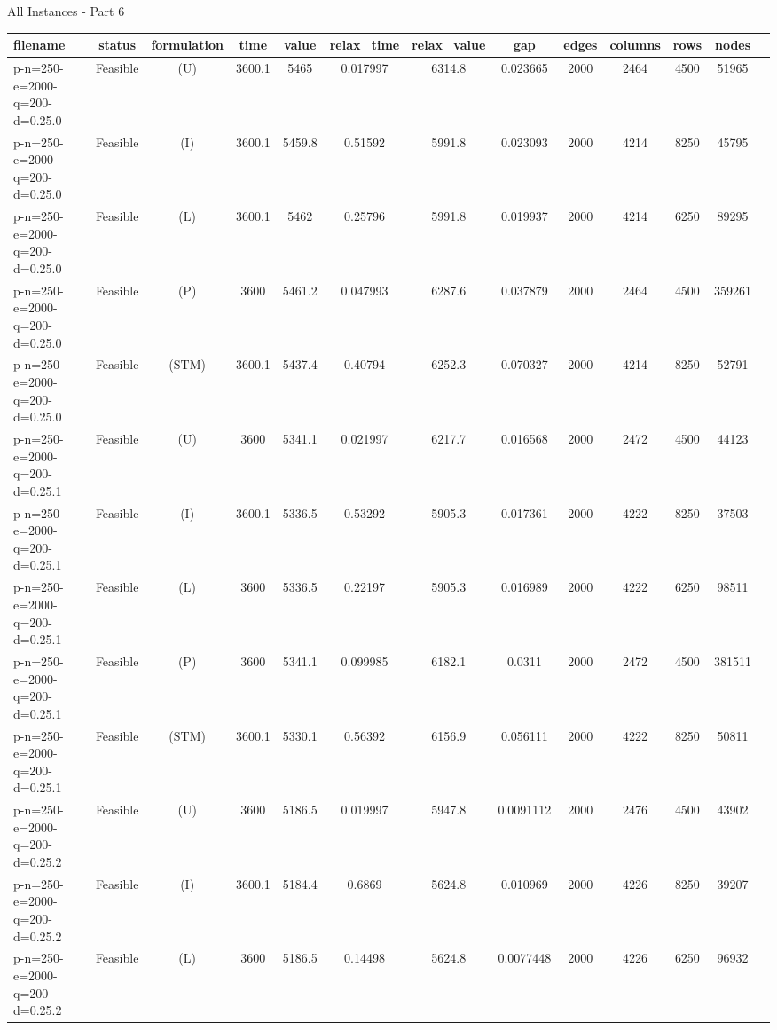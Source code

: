 \documentclass[landscape, a4paper]{article}
\newcommand{\STM}{\ensuremath{\mathrm{STM}}}
\newcommand{\Improved}{\ensuremath{\mathrm{I}}}
\newcommand{\Loose}{\ensuremath{\mathrm{L}}}
\newcommand{\Profit}{\ensuremath{\mathrm{P}}}
\newcommand{\Utility}{\ensuremath{\mathrm{U}}}
\begin{document}
\begin{center}
\newpage
All Instances - Part 6

\begin{tabular}{lcccccccccccc}
filename & status & formulation & time & value & relax\_time & relax\_value & gap & edges & columns & rows & nodes & \\
\hline
p-n=250-e=2000-q=200-d=0.25.0 & Feasible & (\Utility) & 3600.1 & 5465 & 0.017997 & 6314.8 & 0.023665 & 2000 & 2464 & 4500 & 51965 & \\
p-n=250-e=2000-q=200-d=0.25.0 & Feasible & (\Improved) & 3600.1 & 5459.8 & 0.51592 & 5991.8 & 0.023093 & 2000 & 4214 & 8250 & 45795 & \\
p-n=250-e=2000-q=200-d=0.25.0 & Feasible & (\Loose) & 3600.1 & 5462 & 0.25796 & 5991.8 & 0.019937 & 2000 & 4214 & 6250 & 89295 & \\
p-n=250-e=2000-q=200-d=0.25.0 & Feasible & (\Profit) & 3600 & 5461.2 & 0.047993 & 6287.6 & 0.037879 & 2000 & 2464 & 4500 & 359261 & \\
p-n=250-e=2000-q=200-d=0.25.0 & Feasible & (\STM) & 3600.1 & 5437.4 & 0.40794 & 6252.3 & 0.070327 & 2000 & 4214 & 8250 & 52791 & \\
p-n=250-e=2000-q=200-d=0.25.1 & Feasible & (\Utility) & 3600 & 5341.1 & 0.021997 & 6217.7 & 0.016568 & 2000 & 2472 & 4500 & 44123 & \\
p-n=250-e=2000-q=200-d=0.25.1 & Feasible & (\Improved) & 3600.1 & 5336.5 & 0.53292 & 5905.3 & 0.017361 & 2000 & 4222 & 8250 & 37503 & \\
p-n=250-e=2000-q=200-d=0.25.1 & Feasible & (\Loose) & 3600 & 5336.5 & 0.22197 & 5905.3 & 0.016989 & 2000 & 4222 & 6250 & 98511 & \\
p-n=250-e=2000-q=200-d=0.25.1 & Feasible & (\Profit) & 3600 & 5341.1 & 0.099985 & 6182.1 & 0.0311 & 2000 & 2472 & 4500 & 381511 & \\
p-n=250-e=2000-q=200-d=0.25.1 & Feasible & (\STM) & 3600.1 & 5330.1 & 0.56392 & 6156.9 & 0.056111 & 2000 & 4222 & 8250 & 50811 & \\
p-n=250-e=2000-q=200-d=0.25.2 & Feasible & (\Utility) & 3600 & 5186.5 & 0.019997 & 5947.8 & 0.0091112 & 2000 & 2476 & 4500 & 43902 & \\
p-n=250-e=2000-q=200-d=0.25.2 & Feasible & (\Improved) & 3600.1 & 5184.4 & 0.6869 & 5624.8 & 0.010969 & 2000 & 4226 & 8250 & 39207 & \\
p-n=250-e=2000-q=200-d=0.25.2 & Feasible & (\Loose) & 3600 & 5186.5 & 0.14498 & 5624.8 & 0.0077448 & 2000 & 4226 & 6250 & 96932 & \\

\end{tabular}
\end{center}
\end{document}
